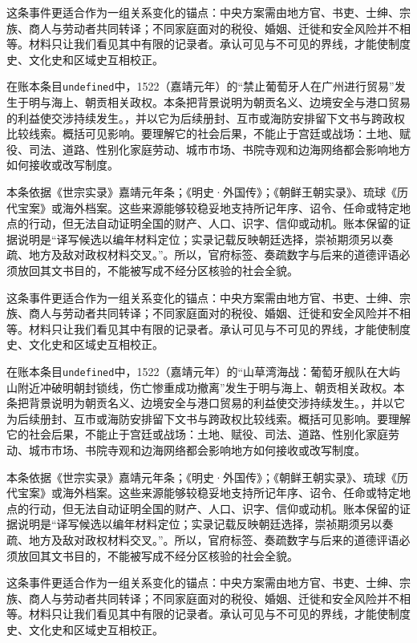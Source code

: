 这条事件更适合作为一组关系变化的锚点：中央方案需由地方官、书吏、士绅、宗族、商人与劳动者共同转译；不同家庭面对的税役、婚姻、迁徙和安全风险并不相等。材料只让我们看见其中有限的记录者。承认可见与不可见的界线，才能使制度史、文化史和区域史互相校正。

在账本条目\texttt{undefined}中，1522（嘉靖元年）的“禁止葡萄牙人在广州进行贸易”发生于明与海上、朝贡相关政权。本条把背景说明为朝贡名义、边境安全与港口贸易的利益使交涉持续发生。，并以它为后续册封、互市或海防安排留下文书与跨政权比较线索。概括可见影响。要理解它的社会后果，不能止于宫廷或战场：土地、赋役、司法、道路、性别化家庭劳动、城市市场、书院寺观和边海网络都会影响地方如何接收或改写制度。

本条依据《世宗实录》嘉靖元年条；《明史·外国传》；《朝鲜王朝实录》、琉球《历代宝案》或海外档案。这些来源能够较稳妥地支持所记年序、诏令、任命或特定地点的行动，但无法自动证明全国的财产、人口、识字、信仰或动机。账本保留的证据说明是“译写候选以编年材料定位；实录记载反映朝廷选择，崇祯期须另以奏疏、地方及敌对政权材料交叉。”。所以，官府标签、奏疏数字与后来的道德评语必须放回其文书目的，不能被写成不经分区核验的社会全貌。

这条事件更适合作为一组关系变化的锚点：中央方案需由地方官、书吏、士绅、宗族、商人与劳动者共同转译；不同家庭面对的税役、婚姻、迁徙和安全风险并不相等。材料只让我们看见其中有限的记录者。承认可见与不可见的界线，才能使制度史、文化史和区域史互相校正。

在账本条目\texttt{undefined}中，1522（嘉靖元年）的“山草湾海战：葡萄牙舰队在大屿山附近冲破明朝封锁线，伤亡惨重成功撤离”发生于明与海上、朝贡相关政权。本条把背景说明为朝贡名义、边境安全与港口贸易的利益使交涉持续发生。，并以它为后续册封、互市或海防安排留下文书与跨政权比较线索。概括可见影响。要理解它的社会后果，不能止于宫廷或战场：土地、赋役、司法、道路、性别化家庭劳动、城市市场、书院寺观和边海网络都会影响地方如何接收或改写制度。

本条依据《世宗实录》嘉靖元年条；《明史·外国传》；《朝鲜王朝实录》、琉球《历代宝案》或海外档案。这些来源能够较稳妥地支持所记年序、诏令、任命或特定地点的行动，但无法自动证明全国的财产、人口、识字、信仰或动机。账本保留的证据说明是“译写候选以编年材料定位；实录记载反映朝廷选择，崇祯期须另以奏疏、地方及敌对政权材料交叉。”。所以，官府标签、奏疏数字与后来的道德评语必须放回其文书目的，不能被写成不经分区核验的社会全貌。

这条事件更适合作为一组关系变化的锚点：中央方案需由地方官、书吏、士绅、宗族、商人与劳动者共同转译；不同家庭面对的税役、婚姻、迁徙和安全风险并不相等。材料只让我们看见其中有限的记录者。承认可见与不可见的界线，才能使制度史、文化史和区域史互相校正。


